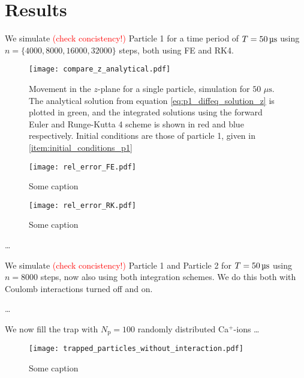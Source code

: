 \section{Results}\label{sec:results}



We simulate \textcolor{red}{(check concistency!)} Particle 1 for a time period of $T = 50 \,\mathrm{\text{\textmu} s}$ using $n=\{4000, 8000, 16000, 32000 \}$ steps, both using FE and RK4. %


\begin{figure}[h!]
    \texttt{[image: compare\_z\_analytical.pdf]}
    \caption{Movement in the $z$-plane for a single particle, simulation for $50$ $\mu\mathrm{s}$. The analytical solution from equation \ref{eq:p1_diffeq_solution_z} is plotted in green, and the integrated solutions using the forward Euler and Runge-Kutta 4 scheme is shown in red and blue respectively. Initial conditions are those of particle 1, given in \ref{item:initial_conditions_p1} }
    \label{fig:compare_z_analytical}
\end{figure}


\begin{figure}[h!]
    \texttt{[image: rel\_error\_FE.pdf]}
    \caption{Some caption}
    \label{fig:error_FE}
\end{figure}


\begin{figure}[h!]
    \texttt{[image: rel\_error\_RK.pdf]}
    \caption{Some caption}
    \label{fig:error_RK}
\end{figure}

\dots



We simulate \textcolor{red}{(check concistency!)} Particle 1 and Particle 2 for $T = 50 \,\mathrm{\text{\textmu} s}$ using $n=8000$ steps, now also using both integration schemes. We do this both with Coulomb interactions turned off and on. 


\dots


We now fill the trap with $N_\mathrm{p} = 100$ randomly distributed Ca$^+$-ions \dots
\begin{figure}[h!]
    \texttt{[image: trapped\_particles\_without\_interaction.pdf]}
    \caption{Some caption}
    \label{fig:trapped_without}
\end{figure}

